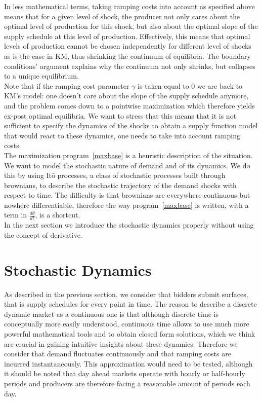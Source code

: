 In less mathematical terms, taking ramping costs into account as specified above means that for a given level of shock, the producer not only cares about the optimal level of production for this shock, but also about the optimal slope of the supply schedule at this level of production. Effectively, this means that optimal levels of production cannot be chosen independently for different level of shocks as is the case in KM, thus shrinking the continuum of equilibria. The boundary conditions' argument explains why the continuum not only shrinks, but collapses to a unique equilibrium. \\

Note that if the ramping cost parameter $\gamma$ is taken equal to $0$ we are back to KM's model: one doesn't care about the slope of the supply schedule anymore, and the problem comes down to a pointwise maximization which therefore yields ex-post optimal equilibria. We want to stress that this means that it is not sufficient to specify the dynamics of the shocks to obtain a supply function model that would react to these dynamics, one needs to take into account ramping costs.\\

The maximization program~\ref{maxbase} is a heuristic description of the situation. We want to model the stochastic nature of demand and of its dynamics. We do this by using It\={o} processes, a class of stochastic processes built through brownians, to describe the stochastic trajectory of the demand shocks with respect to time. The difficulty is that brownians are everywhere continuous but nowhere differentiable, therefore the way program~\ref{maxbase} is written, with a term in $\frac{d\theta}{dt}$, is a shortcut.\\

In the next section we introduce the stochastic dynamics properly without using the concept of derivative. 


\section{Stochastic Dynamics}\label{math}

As described in the previous section, we consider that bidders submit surfaces, that is supply schedules for every point in time. The reason to describe a discrete dynamic market as a continuous one is that although discrete time is conceptually more easily understood, continuous time allows to use much more powerful mathematical tools and to obtain closed form solutions, which we think are crucial in gaining intuitive insights about these dynamics. Therefore we consider that demand fluctuates continuously and that ramping costs are incurred instantaneously. This approximation would need to be tested, although it should be noted that day ahead markets operate with hourly or half-hourly periods and producers are therefore facing a reasonable amount of periods each day. \\ 

